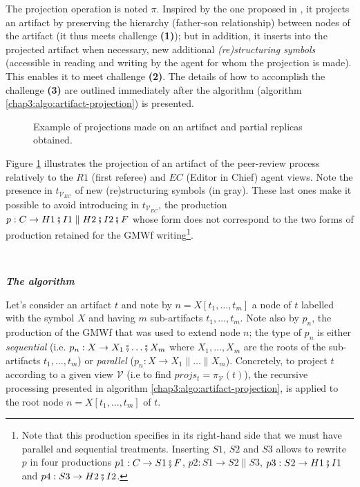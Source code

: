 The projection operation is noted $\pi$. Inspired by the one proposed in \cite{badouelTchoupeCmcs}, it projects an artifact by preserving the hierarchy (father-son relationship) between nodes of the artifact (it thus meets challenge \textbf{(1)}); but in addition, it inserts into the projected artifact when necessary, new additional \textit{(re)structuring symbols } (accessible in reading and writing by the agent for whom the projection is made). This enables it to meet challenge \textbf{(2)}. The details of how to accomplish the challenge \textbf{(3)} are outlined immediately after the algorithm (algorithm \ref{chap3:algo:artifact-projection}) is presented.
\begin{figure}[ht!]
	\noindent
	\caption{Example of projections made on an artifact and partial replicas obtained.}
	\label{chap3:fig:partial-replicas}
\end{figure}

Figure \ref{chap3:fig:partial-replicas} illustrates the projection of an artifact of the peer-review process relatively to the $R1$ (first referee) and $EC$ (Editor in Chief) agent views. Note the presence in $t_{\mathcal{V}_{EC}}$ of new (re)structuring symbols (in gray). These last ones make it possible to avoid introducing in $t_{\mathcal{V}_{EC}}$, the production $p: C \rightarrow H1 \fatsemi I1 \parallel H2 \fatsemi I2 \fatsemi F$ whose form does not correspond to the two forms of production retained for the GMWf writing\footnote{Note that this production specifies in its right-hand side that we must have parallel and sequential treatments.
Inserting $S1$, $S2$ and $S3$ allows to rewrite $p$ in four productions $p1: C \rightarrow S1 \fatsemi F$, $p2: S1 \rightarrow S2 \parallel S3$, $p3: S2 \rightarrow H1 \fatsemi I1$ and $p4: S3 \rightarrow H2 \fatsemi I2$.}.

~

\noindent\textbf{\textit{The algorithm}}

Let's consider an artifact $t$ and note by $n=X\left[t_1,\ldots,t_m\right]$ a node of $t$ labelled with the symbol $X$ and having $m$ sub-artifacts $t_1,\ldots,t_m$. Note also by $p_n$, the production of the GMWf that was used to extend node $n$; the type of $p_n$ is either \textit{sequential} (i.e. $p_n: X \rightarrow X_1 \fatsemi \ldots \fatsemi X_m$ where $X_1,\ldots,X_m$ are the roots of the sub-artifacts $t_1,\ldots,t_m$) or \textit{parallel} ($p_n: X \rightarrow X_1 \parallel \ldots \parallel X_m$). 
Concretely, to project $t$ according to a given view $\mathcal{V}$ (i.e to find $\mathit{projs_t}=\pi_{\mathcal{V}}\left(t \right)$), the recursive processing presented in algorithm \ref{chap3:algo:artifact-projection}, is applied to the root node $n=X\left[t_1,\ldots,t_m\right]$ of $t$.

